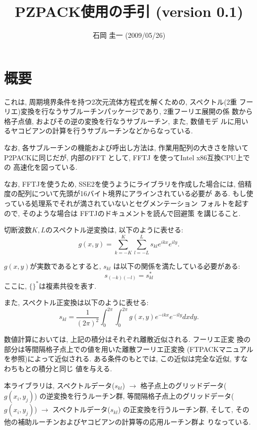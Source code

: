 \documentclass[a4j,fleqn]{jarticle}
\title{PZPACK使用の手引 (version 0.1)}
\author{石岡 圭一  (2009/05/26)}
\date{}
\begin{document}
\maketitle

\section{概要}

これは, 周期境界条件を持つ2次元流体方程式を解くための, スペクトル(2重
フーリエ)変換を行なうサブルーチンパッケージであり, 2重フーリエ展開の係
数から格子点値, およびその逆の変換を行なうサブルーチン, また, 数値モデ
ルに用いるヤコビアンの計算を行うサブルーチンなどからなっている.

なお, 各サブルーチンの機能および呼出し方法は, 作業用配列の大きさを除いて
P2PACKに同じだが, 内部のFFT として, FFTJ を使ってIntel x86互換CPU上での
高速化を図っている.

なお, FFTJを使うため, SSE2を使うようにライブラリを作成した場合には, 
倍精度の配列について先頭が16バイト境界にアラインされている必要が
ある. もし使っている処理系でそれが満されていないとセグメンテーション
フォルトを起すので, そのような場合は FFTJのドキュメントを読んで回避策
を講じること.

切断波数$K,L$のスペクトル逆変換は, 以下のように表せる:
\begin{equation}
g(x,y)=\sum^K_{k=-K}\sum^L_{l=-L}
s_{kl}e^{ikx}e^{ily}.
\end{equation}

$g(x,y)$が実数であるとすると, $s_{kl}$
は以下の関係を満たしている必要がある:
\begin{equation}
s_{(-k)(-l)}=s_{kl}^{*}
\end{equation}
ここに, $\{ \}^{*}$は複素共役を表す.

また, スペクトル正変換は以下のように表せる:
\begin{equation}
s_{kl}=\frac1{(2\pi)^2}\int^{2\pi}_0\int^{2\pi}_0
g(x,y)e^{-ikx}e^{-ily}dxdy.
\end{equation}

数値計算においては, 上記の積分はそれぞれ離散近似される. フーリエ正変
換の部分は等間隔格子点上での値を用いた離散フーリエ正変換
(FTPACKマニュアルを参照)によって近似される.
ある条件のもとでは, この近似は完全な近似, すなわちもとの積分と同じ
値を与える.

本ライブラリは, 
スペクトルデータ($s_{kl}$) 
$\to$ 格子点上のグリッドデータ($g(x_i,y_j)$) 
の逆変換を行うルーチン群,
等間隔格子点上のグリッドデータ($g(x_i,y_j)$) 
$\to$ スペクトルデータ($s_{kl}$) 
の正変換を行うルーチン群, 
そして, その他の補助ルーチンおよびヤコビアンの計算等の応用ルーチン群よ
りなっている.
\end{document}
